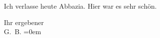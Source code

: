 \pstart
           Ich verlasse heute Abbazia. Hier war es sehr
               schön.\pend
           
\pstart
           Ihr ergebener{\\[\baselineskip]}\spacefill\mbox{G. B.}\pend
           \leftskip=0em{}\endnumbering{}  \newcommand{\dateiname}{L01123}\newcommand{\titel}{Georg Brandes an Arthur Schnitzler, 22. 5. 1901}\newcommand{\editorInnen}{Martin Anton Müller und Gerd-Hermann Susen}
